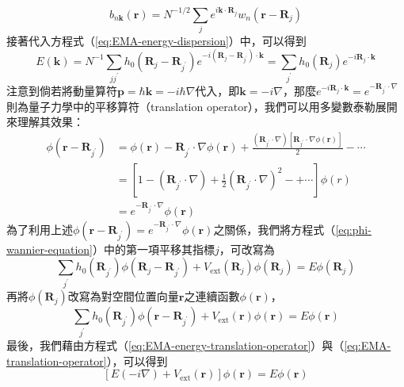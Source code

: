 \begin{equation}
b_{n\mathbf{k}}(\mathbf{r})=N^{-1/2}\sum_je^{i\mathbf{k}\cdot\mathbf{R}_j}w_n(\mathbf{r}-\mathbf{R}_j)
\end{equation}
接著代入方程式（\ref{eq:EMA-energy-dispersion}）中，可以得到
\begin{equation}
\label{eq:EMA-energy-translation-operator}
E(\mathbf{k})=N^{-1}\sum_{jj^\prime}h_0(\mathbf{R}_j-\mathbf{R}_{j^\prime})e^{-i(\mathbf{R}_j-\mathbf{R}_{j^\prime})\cdot\mathbf{k}}=\sum_{j^\prime}h_0(\mathbf{R}_j)e^{-i\mathbf{R}_j\cdot\mathbf{k}}
\end{equation}
注意到倘若將動量算符$\mathbf{p}=\hbar\mathbf{k}=-i\hbar\nabla$代入，即$\mathbf{k}=-i\nabla$，那麼$e^{-i\mathbf{R}_j\cdot\mathbf{k}}=e^{-\mathbf{R}_{j^\prime}\cdot\nabla}$則為量子力學中的平移算符（translation operator），我們可以用多變數泰勒展開來理解其效果：
\begin{equation}
\label{eq:EMA-translation-operator}
\begin{aligned}
\phi(\mathbf{r}-\mathbf{R}_{j^\prime})&=\phi(\mathbf{r})-\mathbf{R}_{j^\prime}\cdot\nabla\phi(\mathbf{r})+\frac{(\mathbf{R}_{j^\prime}\cdot\nabla)[\mathbf{R}_{j^\prime}\cdot\nabla\phi(\mathbf{r})]}{2}-\cdots\\[5pt]
&=\left[1-\left(\mathbf{R}_{j^\prime}\cdot\nabla\right)+\frac{1}{2}\left(\mathbf{R}_{j^\prime}\cdot\nabla\right)^2-+\cdots\right]\phi(r)\\[5pt]
&=e^{-\mathbf{R}_{j^\prime}\cdot\nabla}\phi(\mathbf{r})
\end{aligned}
\end{equation}
為了利用上述$\phi(\mathbf{r}-\mathbf{R}_{j^\prime})=e^{-\mathbf{R}_{j^\prime}\cdot\nabla}\phi(\mathbf{r})$之關係，我們將方程式（\ref{eq:phi-wannier-equation}）中的第一項平移其指標$j$，可改寫為
\begin{equation}
\sum_{j^\prime}h_0(\mathbf{R}_{j^\prime})\phi(\mathbf{R}_j-\mathbf{R}_{j^\prime})+V_\text{ext}(\mathbf{R}_j)\phi(\mathbf{R}_j)=E\phi(\mathbf{R}_j)
\end{equation}
再將$\phi(\mathbf{R}_j)$改寫為對空間位置向量$\mathbf{r}$之連續函數$\phi(\mathbf{r})$，
\begin{equation}
\sum_{j^\prime}h_0(\mathbf{R}_{j^\prime})\phi(\mathbf{r}-\mathbf{R}_{j^\prime})+V_\text{ext}(\mathbf{r})\phi(\mathbf{r})=E\phi(\mathbf{r})
\end{equation}
最後，我們藉由方程式（\ref{eq:EMA-energy-translation-operator}）與（\ref{eq:EMA-translation-operator}），可以得到
\begin{equation}
\label{eq:EMA-final-form}
\left[E(-i\nabla)+V_\text{ext}(\mathbf{r})\right]\phi(\mathbf{r})=E\phi(\mathbf{r})
\end{equation}
